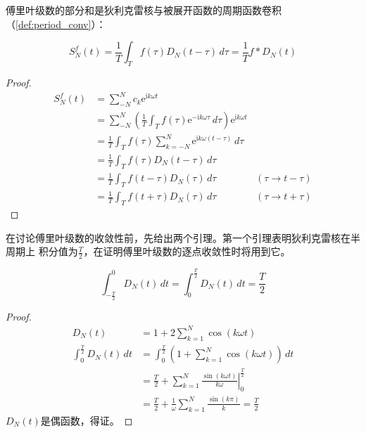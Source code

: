 傅里叶级数的部分和是狄利克雷核与被展开函数的周期函数卷积（\cref{def:period_conv}）：
\begin{proposition}
    \[S_N^f(t)=\frac{1}{T}\int_{T}f(\tau)D_N(t-\tau)\,d\tau=\frac{1}{T}f*D_N(t)\]
\end{proposition}
\begin{proof}
    \begin{align*}
    S_N^f(t) & =\sum_{-N}^{N}c_k \mathrm{e}^{\mathrm{i}k\omega t}\\
             & =\sum_{-N}^{N}\left(\frac{1}{T}\int_{T}f(\tau)\mathrm{e}^{-\mathrm{i}k\omega \tau}\,d\tau\right) \mathrm{e}^{\mathrm{i}k\omega t}\\
             & =\frac{1}{T}\int_{T}f(\tau)\sum_{k=-N}^{N}\mathrm{e}^{\mathrm{i}k\omega (t-\tau)}\,d\tau\\
             & =\frac{1}{T}\int_{T}f(\tau)D_N(t-\tau)\,d\tau\\
             & =\frac{1}{T}\int_{T}f(t-\tau)D_N(\tau)\,d\tau                                                & (\tau\to t-\tau)\\
             & =\frac{1}{T}\int_{T}f(t+\tau)D_N(\tau)\,d\tau                                                & (\tau\to t+\tau)
\end{align*}
\end{proof}

在讨论傅里叶级数的收敛性前，先给出两个引理。第一个引理表明狄利克雷核在半周期上
积分值为$\frac{T}{2}$，在证明傅里叶级数的逐点收敛性时将用到它。
\begin{lemma}
    $$\int_{-\frac{T}{2}}^{0}D_N(t)\,dt=\int_{0}^{\frac{T}{2}}D_N(t)\,dt=\frac{T}{2}$$
\end{lemma}
\begin{proof}
    \begin{align*}
    D_N(t)&=1+2\sum_{k=1}^{N}\cos(k\omega t)\\
    \int_{0}^{\frac{T}{2}}D_N(t)\,dt & =\int_{0}^{\frac{T}{2}}\left(1+\sum_{k=1}^{N}\cos(k\omega t)\right)\,dt                              \\
                                     & =\frac{T}{2}+\sum_{k=1}^{N}\left.\frac{\sin(k\omega t)}{k\omega}\right|_{0}^{\frac{T}{2}} \\
                                     & =\frac{T}{2}+\frac{1}{\omega}\sum_{k=1}^{N}\frac{\sin(k\pi)}{k}=\frac{T}{2}               
\end{align*}
$D_N(t)$是偶函数，得证。
\end{proof}

